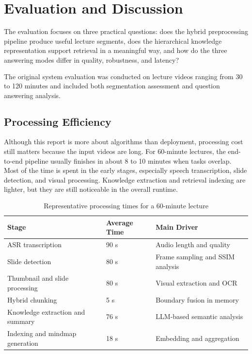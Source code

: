 \section{Evaluation and Discussion}

The evaluation focuses on three practical questions: does the hybrid preprocessing pipeline produce useful lecture segments, does the hierarchical knowledge representation support retrieval in a meaningful way, and how do the three answering modes differ in quality, robustness, and latency?

The original system evaluation was conducted on lecture videos ranging from 30 to 120 minutes and included both segmentation assessment and question answering analysis.

\subsection{Processing Efficiency}

Although this report is more about algorithms than deployment, processing cost still matters because the input videos are long. For 60-minute lectures, the end-to-end pipeline usually finishes in about 8 to 10 minutes when tasks overlap. Most of the time is spent in the early stages, especially speech transcription, slide detection, and visual processing. Knowledge extraction and retrieval indexing are lighter, but they are still noticeable in the overall runtime.

\begin{table}[H]
    \centering
    \caption{Representative processing times for a 60-minute lecture}
    \begin{tabular}{@{}lll@{}}
        \toprule
        \textbf{Stage} & \textbf{Average Time} & \textbf{Main Driver} \\ \midrule
        ASR transcription & 90 s & Audio length and quality \\
        Slide detection & 80 s & Frame sampling and SSIM analysis \\
        Thumbnail and slide processing & 80 s & Visual extraction and OCR \\
        Hybrid chunking & 5 s & Boundary fusion in memory \\
        Knowledge extraction and summary & 76 s & LLM-based semantic analysis \\
        Indexing and mindmap generation & 18 s & Embedding and aggregation \\ \bottomrule
    \end{tabular}
\end{table}

